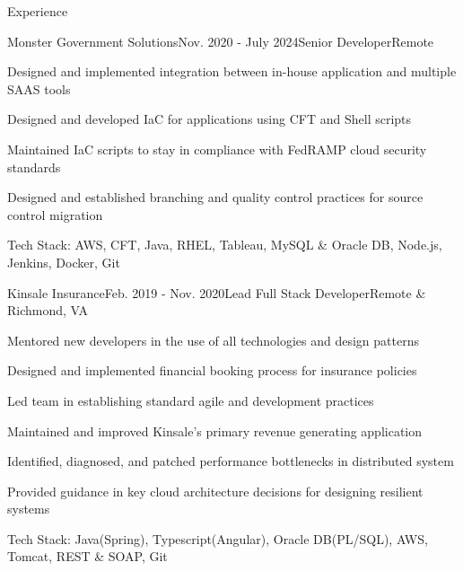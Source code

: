 \documentclass{resume} %
\begin{document}

\begin{rSection}{Experience}

	\begin{rSubsection}{Monster Government Solutions}{Nov. 2020 - July 2024}{\vspace{-0.5em}Senior Developer}{Remote}
		\item Designed and implemented integration between in-house application and multiple SAAS tools
		\item Designed and developed IaC for applications using CFT and Shell scripts
		\item Maintained IaC scripts to stay in compliance with FedRAMP cloud security standards
		\item Designed and established branching and quality control practices for source control migration
		\item Tech Stack: AWS, CFT, Java, RHEL, Tableau, MySQL \& Oracle DB, Node.js, Jenkins, Docker, Git
	\end{rSubsection}

	\begin{rSubsection}{Kinsale Insurance}{Feb. 2019 - Nov. 2020}{\vspace{-0.5em}Lead Full Stack Developer}{Remote \& Richmond, VA}
			\item Mentored new developers in the use of all technologies and design patterns
			\item Designed and implemented financial booking process for insurance policies
			\item Led team in establishing standard agile and development practices
	    	\item Maintained and improved Kinsale's primary revenue generating application
			\item Identified, diagnosed, and patched performance bottlenecks in distributed system
			\item Provided guidance in key cloud architecture decisions for designing resilient systems
			\item Tech Stack: Java(Spring), Typescript(Angular), Oracle DB(PL/SQL), AWS, Tomcat, REST \& SOAP, Git


	\end{rSubsection}



\end{rSection}
\end{document}
